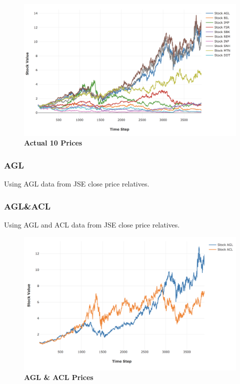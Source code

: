 \documentclass[a4paper,11pt,oneside]{article}
\theoremstyle{plain}
\theoremstyle{definition}
\begin{document}
\begin{figure}[H]
	\centering
	\includegraphics[scale=0.45]{images/results/prices/actual10_prices.png} 
	\caption[Actual 10 Prices]{\textbf{Actual 10 Prices}}
	\label{figure-actual10_prices}
\end{figure}

\subsubsection{AGL}\label{dataset_agl}

Using AGL data from JSE close price relatives.

\subsubsection{AGL\&ACL}\label{dataset_aglacl}

Using AGL and ACL data from JSE close price relatives.

\begin{figure}[H]
	\centering
	\includegraphics[scale=0.4]{images/results/prices/aglacl_prices.png} 
	\caption[AGL \& ACL Prices]{\textbf{AGL \& ACL Prices}}
	\label{figure-aglacl_prices}
\end{figure}
\end{document}
